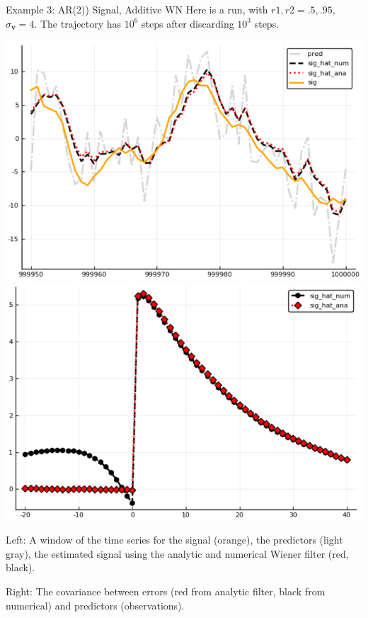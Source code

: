 \documentclass{beamer}  %
\begin{document}
\begin{frame}{Example 3: AR(2)) Signal, Additive WN}
	Here is a run, with $r1, r2 = .5, .95$, $\sigma_{\textbf{v}} = 4$. The trajectory has $10^6$ steps after discarding $10^3$ steps. 
	
	\includegraphics[scale=.33]{fig/figAR2_ts.png}
	\includegraphics[scale=.33]{fig/figAR2_cov.png}
	
	Left: A window of the time series for the signal (orange), the predictors (light gray), the estimated signal using the analytic and numerical Wiener filter (red, black). 
	
	Right: The covariance between errors (red from analytic filter, black from numerical) and predictors (observations). \\
\end{frame}


\end{document}
